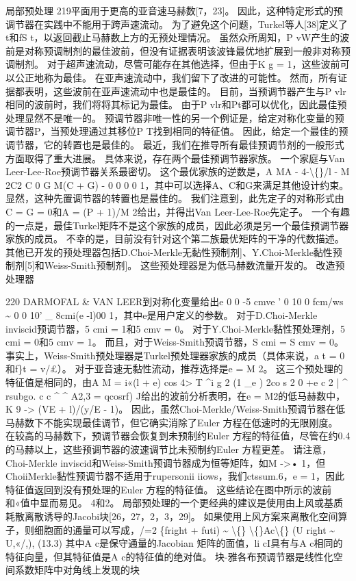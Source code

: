 \documentclass[UTF8,11pt,a4paper,openany,fontset=fandol]{ctexbook}
\begin{document}
局部预处理 219平面用于更高的亚音速马赫数[7，23]。 因此，这种特定形式的预调节器在实践中不能用于跨声速流动。 为了避免这个问题，Turkel等人[38]定义了t和fS t，以返回截止马赫数上方的无预处理情况。 虽然众所周知，P vW产生的波前是对称预调制剂的最佳波前，但没有证据表明该波锋最优地扩展到一般非对称预调制剂。 对于超声速流动，尽管可能存在其他选择，但由于K g = 1，这些波前可以公正地称为最佳。 在亚声速流动中，我们留下了改进的可能性。 然而，所有证据都表明，这些波前在亚声速流动中也是最佳的。 目前，当预调节器产生与P vlr相同的波前时，我们将将其标记为最佳。 由于P vlr和Pt都可以优化，因此最佳预处理显然不是唯一的。 预调节器非唯一性的另一个例证是，给定对称化变量的预调节器P，当预处理通过其移位P T找到相同的特征值。 因此，给定一个最佳的预调节器，它的转置也是最佳的。 最近，我们在推导所有最佳预调节剂的一般形式方面取得了重大进展。 具体来说，存在两个最佳预调节器家族。 一个家庭与Van Leer-Lee-Roe预调节器关系最密切。 这个最优家族的逆数是，A MA - 4-\textbackslash\{\}/l - M 2C2 C 0 G M(C + G) - 0 0 0 0 1，其中可以选择A、C和G来满足其他设计约束。 显然，这种先置调节器的转置也是最佳的。 我们注意到，此先定子的对称形式由C = G = 0和A = (P + 1)/M 2给出，并得出Van Leer-Lee-Roe先定子。 一个有趣的一点是，最佳Turkel矩阵不是这个家族的成员，因此必须是另一个最佳预调节器家族的成员。 不幸的是，目前没有针对这个第二族最优矩阵的干净的代数描述。 其他已开发的预处理器包括D.Choi-Merkle无黏性预制剂]、Y.Choi-Merkle黏性预制剂[5]和Weiss-Smith预制剂]。 这些预处理器是为低马赫数流量开发的。 改造预处理器

220 DARMOFAL \& VAN LEER到对称化变量给出e 0 0 -5 cmve ' 0 10 0 fcm/ws \textasciitilde{} 0 0 10' \_ 8cmi(e -l)00 1，其中e是用户定义的参数。 对于D.Choi-Merkle inviscid预调节器，5 cmi = 1和5 cmv = 0。 对于Y.Choi-Merkle黏性预处理剂，5 cmi = 0和5 cmv = 1。 而且，对于Weiss-Smith预调节器，S cmi = S cmv = 0。 事实上，Weiss-Smith预处理器是Turkel预处理器家族的成员（具体来说，a t = 0和f\}t = v/£）。 对于亚音速无黏性流动，推荐选择是e = M 2。 这三个预处理的特征值是相同的，由A M = i«(l + e) cos 4> T \textasciicircum{}i g 2 (1 \_e ) 2co s 2 0 +e c 2 | \textasciicircum{} rsubgo. c c \textasciicircum{} \textasciicircum{} A2,3 = qcosrf) J给出的波前分析表明，在e = M2的低马赫数中，K 9 -> (VE + l)/(y/E - 1)。 因此，虽然Choi-Merkle/Weiss-Smith预调节器在低马赫数下不能实现最佳调节，但它确实消除了Euler 方程在低速时的无限刚度。 在较高的马赫数下，预调节器会恢复到未预制约Euler 方程的特征值，尽管在约0.4的马赫以上，这些预调节器的波速调节比未预制约Euler 方程更差。 请注意，Choi-Merkle inviscid和Weiss-Smith预调节器成为恒等矩阵，如M ->• 1，但ChoiiMerkle黏性预调节器不适用于rupersonii iiows，我们ctssum.6，e = 1，因此特征值返回到没有预处理的Euler 方程的特征值。 这些结论在图中所示的波前和«值中显而易见。 4和2。 局部预处理的一个更经典的建议是使用由上风或基质耗散离散诱导的Jacobi块[26，27，2，3，29]。 如果使用上风方案来离散化空间算子，则细胞面的通量可以写成，/=2 \{fright + futi) \textasciitilde{} \textbackslash\{\} \textbackslash\{\}Ac\textbackslash\{\} (U right \textasciitilde{} U,«/,), (13.3) 其中A c是保守通量的Jacobian 矩阵的面值，li cI具有与A c相同的特征向量，但其特征值是A c的特征值的绝对值。 块-雅各布预调节器是线性化空间系数矩阵中对角线上发现的块
\end{document}
